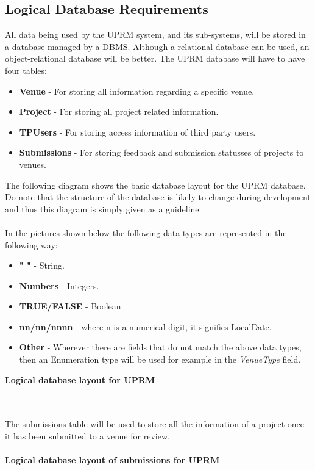 	\newpage	
	\subsection{Logical Database Requirements}
		All data being used by the UPRM system, and its sub-systems, will be stored in a database managed by a DBMS. Although a relational database can be used, an object-relational database will be better. The UPRM database will have to have four tables:
		\begin{itemize}
			\item \textbf{Venue} - For storing all information regarding a specific venue.
			\item \textbf{Project} - For storing all project related information.
			\item \textbf{TPUsers} - For storing access information of third party users.
			\item \textbf{Submissions} - For storing feedback and submission statusses of projects to venues.
		\end{itemize}
		The following diagram shows the basic database layout for the UPRM database. Do note that the structure of the database is likely to change during development and thus this diagram is simply given as a guideline.\\ \\
		In the pictures shown below the following data types are represented in the following way:
		\begin{itemize}
			\item \textbf{" "} - String.
			\item \textbf{Numbers} - Integers.
			\item \textbf{TRUE/FALSE} - Boolean.
			\item \textbf{nn/nn/nnnn} - where n is a numerical digit, it signifies LocalDate.
			\item \textbf{Other} - Wherever there are fields that do not match the above data types, then an Enumeration type will be used for example in the \emph{VenueType} field.\\
		\end{itemize}
		
		\textbf{Logical database layout for UPRM}\\
		\centerline{} \\ \\
		The submissions table will be used to store all the information of a project once it has been submitted to a venue for review.\\ \\
		\textbf{Logical database layout of submissions for UPRM}\\
		\centerline{} \\ \\
		
